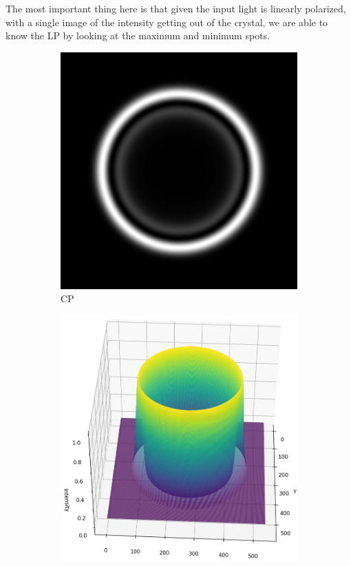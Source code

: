 \documentclass[11pt, a4paper, twoside]{article} %
\begin{document}
The most important thing here is that given the input light is linearly polarized, with a single image of the intensity getting out of the crystal, we are able to know the LP by looking at the maximum and minimum spots.


\begin{figure}[h!] 
     \centering 
    \begin{subfigure}[b]{0.24\linewidth}
    \includegraphics[width=\linewidth]{simul11.png}
    \caption{CP }
     \end{subfigure}
 \begin{subfigure}[b]{0.25\linewidth}
     \includegraphics[width=\linewidth]{simul12.png}

\end{subfigure}
\end{figure}
\end{document}
